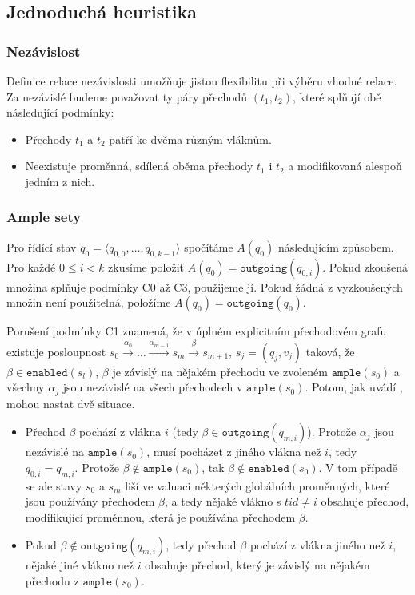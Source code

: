 \documentclass[10pt,a4paper,notitlepage]{report}
\newcommand{\tuple}[1]{\langle #1 \rangle}
\begin{document}
\subsection{Jednoduchá heuristika}
\subsubsection{Nezávislost}
Definice relace nezávislosti umožňuje jistou flexibilitu při výběru vhodné relace. Za nezávislé budeme považovat ty páry přechodů $(t_1, t_2)$, které splňují obě následující podmínky:
\begin{itemize}
\item Přechody $t_1$ a $t_2$ patří ke dvěma různým vláknům.
\item Neexistuje proměnná, sdílená oběma přechody $t_1$ i $t_2$ a modifikovaná alespoň jedním z nich.
\end{itemize}


\subsubsection{Ample sety}
Pro řídící stav $q_0 = \tuple{q_{0,0}, \ldots, q_{0,k-1}}$ spočítáme $A(q_0)$ následujícím způsobem. Pro každé $0 \leq i < k$ zkusíme položit $A(q_0) = \texttt{outgoing}(q_{0,i})$. Pokud zkoušená množina splňuje podmínky C0 až C3, použijeme jí. Pokud žádná z vyzkoušených množin není použitelná, položíme $A(q_0) = \texttt{outgoing}(q_0)$.

Porušení podmínky C1 \label{subsec:c1-violation} znamená, že v úplném explicitním přechodovém grafu existuje posloupnost $s_0 \xrightarrow{\alpha_0} \ldots \xrightarrow{\alpha_{m-1}} s_m \xrightarrow{\beta} s_{m+1}$, $s_j = (q_j, v_j)$ taková, že $\beta \in \texttt{enabled}(s_l)$, $\beta$ je závislý na nějakém přechodu ve zvoleném $\texttt{ample}(s_0)$ a všechny $\alpha_j$ jsou nezávislé na všech přechodech v $\texttt{ample}(s_0)$. Potom, jak uvádí \cite{CLARKE}, mohou nastat dvě situace.

\begin{itemize}
\item Přechod $\beta$ pochází z vlákna $i$ (tedy $\beta \in \texttt{outgoing}(q_{m,i})$).  Protože $\alpha_j$ jsou nezávislé na $\texttt{ample}(s_0)$, musí pocházet z jiného vlákna než $i$, tedy $q_{0,i} = q_{m,i}$. Protože $\beta \not \in \texttt{ample}(s_0)$, tak $\beta \not \in \texttt{enabled}(s_0)$. V tom případě se ale stavy $s_0$ a $s_m$ liší ve valuaci některých globálních proměnných, které jsou používány přechodem $\beta$, a tedy nějaké vlákno s $tid \neq i$ obsahuje přechod, modifikující proměnnou, která je používána přechodem $\beta$.

\item Pokud $\beta \not \in \texttt{outgoing}(q_{m,i})$, tedy přechod $\beta$ pochází z vlákna jiného než $i$, nějaké jiné vlákno než $i$ obsahuje přechod, který je závislý na nějakém přechodu z $\texttt{ample}(s_0)$. 
\end{itemize}
\end{document}
